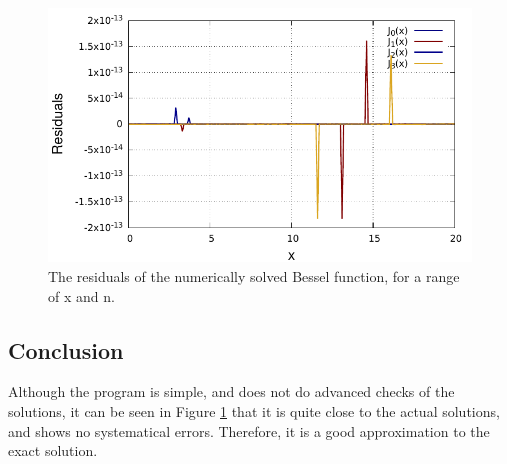\documentclass[twocolumn,article]{memoir}
\begin{document}
\begin{figure}[t]
	\centering
	\includegraphics[width=\linewidth]{fig2.pdf}
	\caption{The residuals of the numerically solved Bessel function, for a range of x and n.}
	\label{fig:2}
\end{figure}

\subsection*{Conclusion}

Although the program is simple, and does not do advanced checks of the solutions, it can be seen in Figure \ref{fig:2} that it is quite close to the actual solutions, and shows no systematical errors. Therefore, it is a good approximation to the exact solution.

\printbibliography
\end{document}
